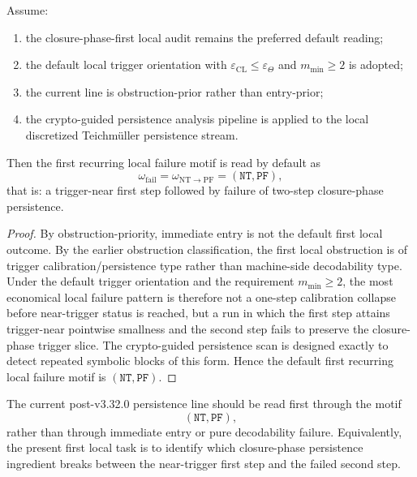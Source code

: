 \begin{theorem}
\label{thm:first-recurring-local-persistence-failure-reading}
Assume:
\begin{enumerate}
    \item the closure-phase-first local audit remains the preferred default reading;
    \item the default local trigger orientation with \(\varepsilon_{\mathrm{CL}}\le \varepsilon_{\Theta}\) and \(m_{\min}\ge 2\) is adopted;
    \item the current line is obstruction-prior rather than entry-prior;
    \item the crypto-guided persistence analysis pipeline is applied to the local discretized Teichm\"uller persistence stream.
\end{enumerate}
Then the first recurring local failure motif is read by default as
\[
\omega_{\mathrm{fail}}
=
\omega_{\mathrm{NT\to PF}}
=
(\mathtt{NT},\mathtt{PF}),
\]
that is: a trigger-near first step followed by failure of two-step closure-phase persistence.
\end{theorem}

\begin{proof}
By obstruction-priority, immediate entry is not the default first local outcome.
By the earlier obstruction classification, the first local obstruction is of trigger calibration/persistence type rather than machine-side decodability type.
Under the default trigger orientation and the requirement \(m_{\min}\ge 2\), the most economical local failure pattern is therefore not a one-step calibration collapse before near-trigger status is reached, but a run in which the first step attains trigger-near pointwise smallness and the second step fails to preserve the closure-phase trigger slice.
The crypto-guided persistence scan is designed exactly to detect repeated symbolic blocks of this form.
Hence the default first recurring local failure motif is \((\mathtt{NT},\mathtt{PF})\).
\end{proof}

\begin{corollary}
\label{cor:current-first-persistence-stream-reading}
The current post-v3.32.0 persistence line should be read first through the motif
\[
(\mathtt{NT},\mathtt{PF}),
\]
rather than through immediate entry or pure decodability failure.
Equivalently, the present first local task is to identify which closure-phase persistence ingredient breaks between the near-trigger first step and the failed second step.
\end{corollary}

